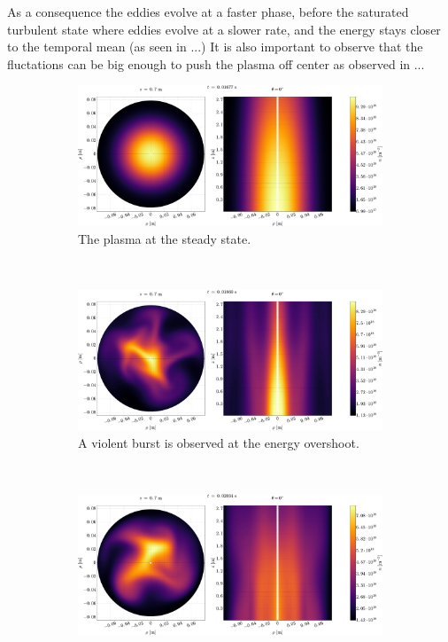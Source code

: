 As a consequence the eddies evolve at a faster phase, before the saturated turbulent state where eddies evolve at a slower rate, and the energy stays closer to the temporal mean (as seen in ...)
It is also important to observe that the fluctations can be big enough to push the plasma off center as observed in ...
%
\begin{figure}[htbp]
    \centering
    \begin{subfigure}[h]{1.00\textwidth}
        \centering
        \includegraphics[width=1.0\textwidth]{fig/results/2DTurbulence/steadyStateN}
        \caption{The plasma at the steady state.}
        \label{fig:2Dsteady}
    \end{subfigure}%
    \\
    \begin{subfigure}[h]{1.00\textwidth}
        \centering
        \includegraphics[width=1.0\textwidth]{fig/results/2DTurbulence/violentBurst}
        \caption{A violent burst is observed at the energy overshoot.}
        \label{fig:violentBurst}
    \end{subfigure}
    \\
    \begin{subfigure}[h]{1.00\textwidth}
        \centering
        \includegraphics[width=1.0\textwidth]{fig/results/2DTurbulence/offCenter}

\end{subfigure}
\end{figure}
